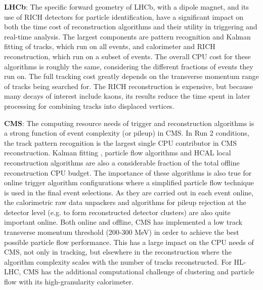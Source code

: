 \vskip 0.5cm
\noindent
{\bf LHCb}: The specific forward geometry of LHCb, with a dipole magnet, and its use of RICH detectors for particle identification, have a significant impact on both the time cost of 
reconstruction algorithms and their utility in triggering and real-time analysis. The largest components are pattern recognition and Kalman fitting of tracks, which run on all events, and 
calorimeter and RICH reconstruction, which run on a subset of events. The overall CPU cost for these algorithms is roughly the same, considering the different fractions of events they run on. 
The full tracking cost greatly depends on the transverse momentum range of tracks being searched for. The RICH reconstruction is expensive, but because many decays of interest include kaons, 
its results reduce the time spent in later processing for combining tracks into displaced vertices.

\vskip 0.5cm
\noindent
{\bf CMS}: The computing resource needs of trigger and reconstruction algorithms is a strong function of event complexity (or pileup) in CMS. In Run 2 conditions, the track pattern recognition 
is the largest single CPU contributor in CMS reconstruction. Kalman fitting \cite{CMS2014}, particle flow algorithms \cite{CMS2017} and HCAL local reconstruction algorithms are also a considerable 
fraction of the total offline reconstruction CPU budget. The importance of these algorithms is also true for online trigger algorithm configurations where a simplified particle flow technique
 is used in the final event selections. As they are carried out in each event online, the calorimetric raw data unpackers and algorithms for pileup rejection at the detector level (e.g. to form 
reconstructed detector clusters) are also quite important online. Both online and offline, CMS has implemented a low track transverse momentum threshold (200-300 MeV) in order to achieve the best possible particle 
flow performance. This has a large impact on the CPU needs of CMS, not only in tracking, but elsewhere in the reconstruction where the algorithm complexity scales with the number of tracks 
reconstructed. For HL-LHC, CMS has the additional computational challenge of clustering and particle flow with its high-granularity calorimeter.

